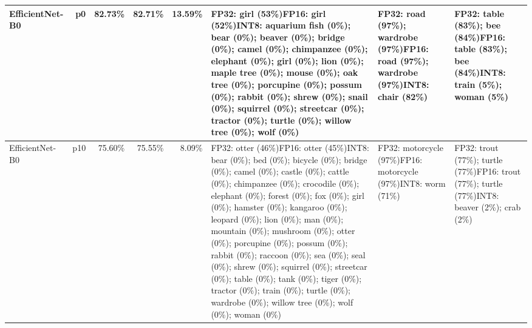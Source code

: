 \begin{longtable}{p{2.8cm} r r r r p{5.0cm} p{4.2cm} p{4.2cm}}
EfficientNet-B0 & p0 & 82.73\% & 82.71\% & 13.59\% & FP32: girl (53\%)\newline FP16: girl (52\%)\newline INT8: aquarium fish (0\%); bear (0\%); beaver (0\%); bridge (0\%); camel (0\%); chimpanzee (0\%); elephant (0\%); girl (0\%); lion (0\%); maple tree (0\%); mouse (0\%); oak tree (0\%); porcupine (0\%); possum (0\%); rabbit (0\%); shrew (0\%); snail (0\%); squirrel (0\%); streetcar (0\%); tractor (0\%); turtle (0\%); willow tree (0\%); wolf (0\%) & FP32: road (97\%); wardrobe (97\%)\newline FP16: road (97\%); wardrobe (97\%)\newline INT8: chair (82\%) & FP32: table (83\%); bee (84\%)\newline FP16: table (83\%); bee (84\%)\newline INT8: train (5\%); woman (5\%) \\ \hline
EfficientNet-B0 & p10 & 75.60\% & 75.55\% & 8.09\% & FP32: otter (46\%)\newline FP16: otter (45\%)\newline INT8: bear (0\%); bed (0\%); bicycle (0\%); bridge (0\%); camel (0\%); castle (0\%); cattle (0\%); chimpanzee (0\%); crocodile (0\%); elephant (0\%); forest (0\%); fox (0\%); girl (0\%); hamster (0\%); kangaroo (0\%); leopard (0\%); lion (0\%); man (0\%); mountain (0\%); mushroom (0\%); otter (0\%); porcupine (0\%); possum (0\%); rabbit (0\%); raccoon (0\%); sea (0\%); seal (0\%); shrew (0\%); squirrel (0\%); streetcar (0\%); table (0\%); tank (0\%); tiger (0\%); tractor (0\%); train (0\%); turtle (0\%); wardrobe (0\%); willow tree (0\%); wolf (0\%); woman (0\%) & FP32: motorcycle (97\%)\newline FP16: motorcycle (97\%)\newline INT8: worm (71\%) & FP32: trout (77\%); turtle (77\%)\newline FP16: trout (77\%); turtle (77\%)\newline INT8: beaver (2\%); crab (2\%) \\ \hline

\end{longtable}
